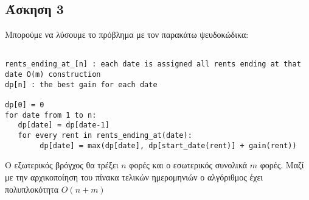 \subsection*{Άσκηση 3}

Μπορούμε να λύσουμε το πρόβλημα με τον παρακάτω ψευδοκώδικα:

\begin{verbatim}

rents_ending_at_[n] : each date is assigned all rents ending at that date O(m) construction
dp[n] : the best gain for each date

dp[0] = 0
for date from 1 to n:
   dp[date] = dp[date-1]
   for every rent in rents_ending_at(date):
        dp[date] = max(dp[date], dp[start_date(rent)] + gain(rent))

\end{verbatim}
        
Ο εξωτερικός βρόγχος θα τρέξει $n$ φορές και ο εσωτερικός συνολικά $m$ φορές.
Μαζί με την αρχικοποίηση του πίνακα τελικών ημερομηνιών ο αλγόριθμος έχει πολυπλοκότητα $O(n+m)$

